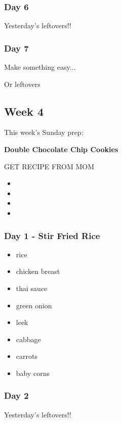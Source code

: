 \documentclass[11pt, a4paper]{article}
\begin{document}
\subsubsection{Day 6}
\vspace{1pc}
Yesterday's leftovers!!

\subsubsection{Day 7}
\vspace{1pc}
\noindent Make something easy...
\par
Or leftovers


\vspace{0.917 pc} %


\pagebreak
\subsection{Week 4}

This week's Sunday prep:
\par
\vspace{1pc}
\noindent\textbf{Double Chocolate Chip Cookies}
\par
GET RECIPE FROM MOM
\begin{itemize}
\item 
\item 
\item 
\item 
\end{itemize}

\subsubsection{Day 1 - Stir Fried Rice}
\vspace{1pc}
\begin{itemize}
\item rice
\item chicken breast
\item thai sauce
\item green onion
\item leek
\item cabbage
\item carrots
\item baby corns
\end{itemize}

\subsubsection{Day 2}
\vspace{1pc}
Yesterday's leftovers!!
\end{document}
